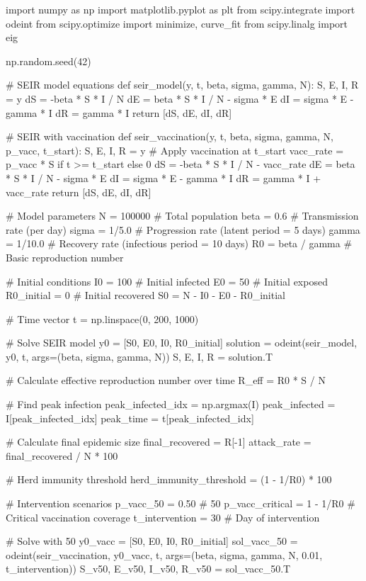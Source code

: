 \documentclass[a4paper, 11pt]{article}
\begin{document}
\begin{pycode}
import numpy as np
import matplotlib.pyplot as plt
from scipy.integrate import odeint
from scipy.optimize import minimize, curve_fit
from scipy.linalg import eig

np.random.seed(42)

# SEIR model equations
def seir_model(y, t, beta, sigma, gamma, N):
    S, E, I, R = y
    dS = -beta * S * I / N
    dE = beta * S * I / N - sigma * E
    dI = sigma * E - gamma * I
    dR = gamma * I
    return [dS, dE, dI, dR]

# SEIR with vaccination
def seir_vaccination(y, t, beta, sigma, gamma, N, p_vacc, t_start):
    S, E, I, R = y
    # Apply vaccination at t_start
    vacc_rate = p_vacc * S if t >= t_start else 0
    dS = -beta * S * I / N - vacc_rate
    dE = beta * S * I / N - sigma * E
    dI = sigma * E - gamma * I
    dR = gamma * I + vacc_rate
    return [dS, dE, dI, dR]

# Model parameters
N = 100000  # Total population
beta = 0.6  # Transmission rate (per day)
sigma = 1/5.0  # Progression rate (latent period = 5 days)
gamma = 1/10.0  # Recovery rate (infectious period = 10 days)
R0 = beta / gamma  # Basic reproduction number

# Initial conditions
I0 = 100  # Initial infected
E0 = 50   # Initial exposed
R0_initial = 0  # Initial recovered
S0 = N - I0 - E0 - R0_initial

# Time vector
t = np.linspace(0, 200, 1000)

# Solve SEIR model
y0 = [S0, E0, I0, R0_initial]
solution = odeint(seir_model, y0, t, args=(beta, sigma, gamma, N))
S, E, I, R = solution.T

# Calculate effective reproduction number over time
R_eff = R0 * S / N

# Find peak infection
peak_infected_idx = np.argmax(I)
peak_infected = I[peak_infected_idx]
peak_time = t[peak_infected_idx]

# Calculate final epidemic size
final_recovered = R[-1]
attack_rate = final_recovered / N * 100

# Herd immunity threshold
herd_immunity_threshold = (1 - 1/R0) * 100

# Intervention scenarios
p_vacc_50 = 0.50  # 50%
p_vacc_critical = 1 - 1/R0  # Critical vaccination coverage
t_intervention = 30  # Day of intervention

# Solve with 50%
y0_vacc = [S0, E0, I0, R0_initial]
sol_vacc_50 = odeint(seir_vaccination, y0_vacc, t,
                     args=(beta, sigma, gamma, N, 0.01, t_intervention))
S_v50, E_v50, I_v50, R_v50 = sol_vacc_50.T


\end{pycode}
\end{document}
